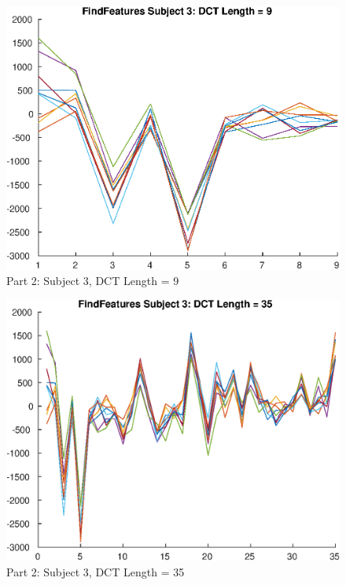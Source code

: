 \documentclass[conference]{IEEEtran}
\begin{document}
  \begin{figure}[H]
    \centering
    \includegraphics[scale=0.5]{./img/part_2_s_3_dct_9.eps}
    \caption{Part 2: Subject 3, DCT Length = 9}
    \label{fig:part_2_s_3_dct_9}
  \end{figure}

  \begin{figure}[H]
    \centering
    \includegraphics[scale=0.5]{./img/part_2_s_3_dct_35.eps}
    \caption{Part 2: Subject 3, DCT Length = 35}
    \label{fig:part_2_s_3_dct_35}
  \end{figure}
\end{document}
